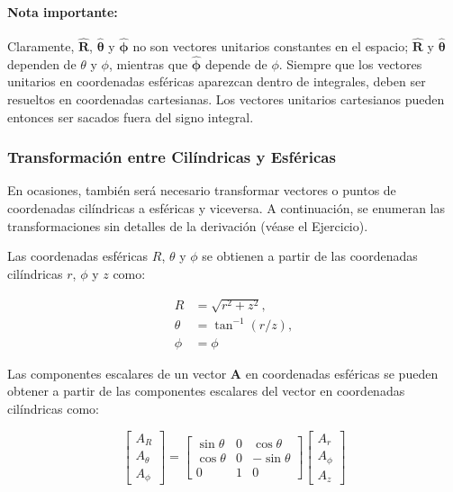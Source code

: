 \documentclass{book}
\begin{document}
\paragraph{Nota importante:} Claramente, $\mathbf{\hat{R}}$, $\mathbf{\hat{\theta}}$ y $\mathbf{\hat{\phi}}$ no son vectores unitarios constantes en el espacio; $\mathbf{\hat{R}}$ y $\mathbf{\hat{\theta}}$ dependen de $\theta$ y $\phi$, mientras que $\mathbf{\hat{\phi}}$ depende de $\phi$. Siempre que los vectores unitarios en coordenadas esféricas aparezcan dentro de integrales, deben ser resueltos en coordenadas cartesianas. Los vectores unitarios cartesianos pueden entonces ser sacados fuera del signo integral.
\subsubsection{Transformación entre Cilíndricas y Esféricas}
En ocasiones, también será necesario transformar vectores o puntos de coordenadas cilíndricas a esféricas y viceversa. A continuación, se enumeran las transformaciones sin detalles de la derivación (véase el Ejercicio).

Las coordenadas esféricas $R$, $\theta$ y $\phi$ se obtienen a partir de las coordenadas cilíndricas $r$, $\phi$ y $z$ como:

\begin{equation}
\begin{aligned}
R &= \sqrt{r^2 + z^2}, \\
\theta &= \tan^{-1} (r/z), \\
\phi &= \phi
\end{aligned}
\end{equation}

Las componentes escalares de un vector $\mathbf{A}$ en coordenadas esféricas se pueden obtener a partir de las componentes escalares del vector en coordenadas cilíndricas como:

\begin{equation}
\begin{bmatrix} A_R \\ A_{\theta} \\ A_{\phi} \end{bmatrix} = 
\begin{bmatrix} 
\sin \theta & 0 & \cos \theta \\
\cos \theta & 0 & -\sin \theta \\
0 & 1 & 0 
\end{bmatrix}
\begin{bmatrix} A_r \\ A_{\phi} \\ A_z \end{bmatrix}
\end{equation}
\end{document}
